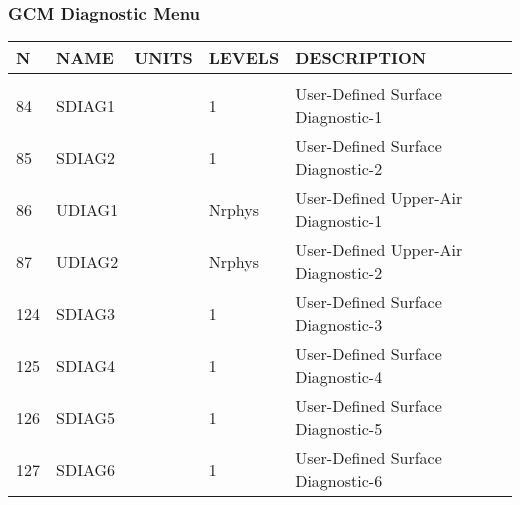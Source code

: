 \subsubsection{GCM Diagnostic Menu}
\label{sec:diagnostics:menu}

\begin{tabular}{lllll}
\hline\hline
N & NAME & UNITS & LEVELS & DESCRIPTION \\
\hline

&\\
84 & SDIAG1   &             &    1  
         &\begin{minipage}[t]{3in}
          {User-Defined Surface Diagnostic-1} 
         \end{minipage}\\
85 & SDIAG2   &             &    1  
         &\begin{minipage}[t]{3in}
          {User-Defined Surface Diagnostic-2} 
         \end{minipage}\\
86 & UDIAG1   &             &    Nrphys
         &\begin{minipage}[t]{3in}
          {User-Defined Upper-Air Diagnostic-1} 
         \end{minipage}\\
87 & UDIAG2   &             &    Nrphys
         &\begin{minipage}[t]{3in}
          {User-Defined Upper-Air Diagnostic-2} 
         \end{minipage}\\
124& SDIAG3   &             &    1  
         &\begin{minipage}[t]{3in}
          {User-Defined Surface Diagnostic-3} 
         \end{minipage}\\
125& SDIAG4   &             &    1  
         &\begin{minipage}[t]{3in}
          {User-Defined Surface Diagnostic-4} 
         \end{minipage}\\
126& SDIAG5   &             &    1  
         &\begin{minipage}[t]{3in}
          {User-Defined Surface Diagnostic-5} 
         \end{minipage}\\
127& SDIAG6   &             &    1  
         &\begin{minipage}[t]{3in}
          {User-Defined Surface Diagnostic-6} 
         \end{minipage}\\

\end{tabular}
